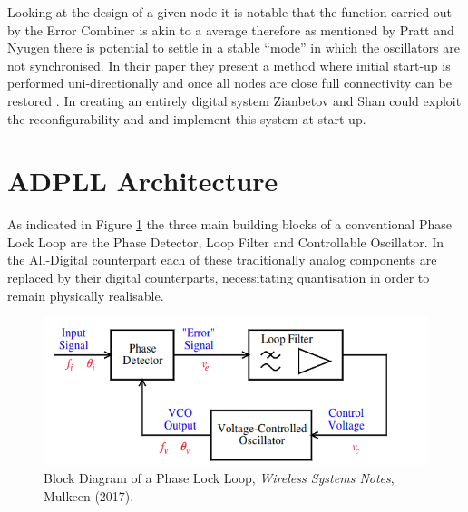 \documentclass[11pt,english,british]{report}
\begin{document}
Looking at the design of a given node it is notable that the function carried out by the Error Combiner  is akin to a average therefore as mentioned by Pratt and Nyugen there is potential to settle in a stable ``mode'' in which the oscillators are not synchronised. In their paper they present a method where initial start-up is performed uni-directionally and once all nodes are close full connectivity can be restored \cite{pratt1995distributed}. In creating an entirely digital system Zianbetov and Shan could exploit the reconfigurability and and implement this system at start-up.

\section{ADPLL Architecture}
As indicated in Figure \ref{fig:mulkeen_pll} the three main building blocks of a conventional Phase Lock Loop are the Phase Detector, Loop Filter and Controllable Oscillator. In the All-Digital counterpart each of these traditionally analog components are replaced by their digital counterparts, necessitating quantisation in order to remain physically realisable. 
\begin{figure}[h]
	\centering
	\includegraphics[scale=0.7]{mulkeen_pll}
	\caption{Block Diagram of a Phase Lock Loop, \textit{Wireless Systems Notes}, Mulkeen (2017).}
	\label{fig:mulkeen_pll}
\end{figure}
\end{document}
